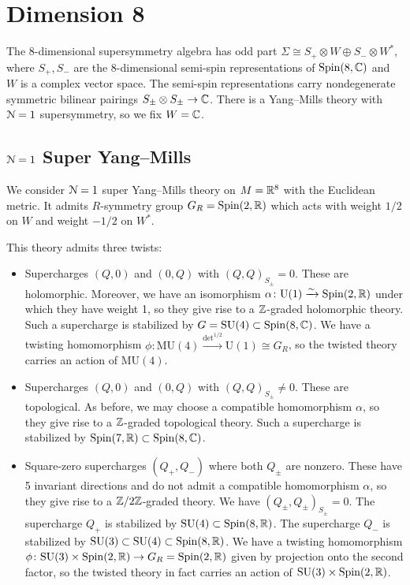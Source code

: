 \documentclass[10pt, oneside]{article}
\newcommand{\MU}{\mathrm{MU}}
\renewcommand{\U}{\mathrm{U}}
\begin{document}
\section{Dimension 8}

The 8-dimensional supersymmetry algebra has odd part $\Sigma\cong S_+\otimes W\oplus S_-\otimes W^*$, where $S_+, S_-$ are the 8-dimensional semi-spin representations of $\mathrm{Spin}(8, \mathbb C)$ and $W$ is a complex vector space. The semi-spin representations carry nondegenerate symmetric bilinear pairings $S_{\pm}\otimes S_{\pm}\rightarrow \mathbb C$. There is a Yang--Mills theory with $\mathcal{N}=1$ supersymmetry, so we fix $W = \mathbb C$.

\subsection{\texorpdfstring{$\mathcal N=1$}{N=1} Super Yang--Mills}

We consider $\mathcal N=1$ super Yang--Mills theory on $M=\mathbb R^8$ with the Euclidean metric. It admits $R$-symmetry group $G_R=\mathrm{Spin}(2, \mathbb R)$ which acts with weight $1/2$ on $W$ and weight $-1/2$ on $W^*$.

This theory admits three twists:
\begin{itemize}
\item Supercharges $(Q, 0)$ and $(0, Q)$ with $(Q, Q)_{S_\pm} = 0$. These are holomorphic. Moreover, we have an isomorphism $\alpha\colon \U(1)\xrightarrow{\sim} \Spin(2, \RR)$ under which they have weight 1, so they give rise to a $\mathbb Z$-graded holomorphic theory. Such a supercharge is stabilized by $G=\mathrm{SU}(4)\subset \mathrm{Spin}(8, \mathbb C)$. We have a twisting homomorphism $\phi\colon \MU(4)\xrightarrow{\det^{1/2}} \U(1)\cong G_R$, so the twisted theory carries an action of $\MU(4)$.

\item Supercharges $(Q, 0)$ and $(0, Q)$ with $(Q, Q)_{S_\pm}\neq 0$. These are topological. As before, we may choose a compatible homomorphism $\alpha$, so they give rise to a $\mathbb Z$-graded topological theory. Such a supercharge is stabilized by $\mathrm{Spin}(7, \mathbb R)\subset \mathrm{Spin}(8, \mathbb C)$.

\item Square-zero supercharges $(Q_+, Q_-)$ where both $Q_{\pm}$ are nonzero. These have 5 invariant directions and do not admit a compatible homomorphism $\alpha$, so they give rise to a $\mathbb Z/2\mathbb Z$-graded theory. We have $(Q_\pm, Q_\pm)_{S_\pm} = 0$. The supercharge $Q_+$ is stabilized by $\mathrm{SU}(4)\subset \mathrm{Spin}(8, \mathbb R)$. The supercharge $Q_-$ is stabilized by $\mathrm{SU}(3)\subset \mathrm{SU}(4)\subset \mathrm{Spin}(8, \mathbb R)$. We have a twisting homomorphism $\phi\colon \mathrm{SU}(3)\times \mathrm{Spin}(2, \mathbb R)\rightarrow G_R=\mathrm{Spin}(2, \mathbb R)$ given by projection onto the second factor, so the twisted theory in fact carries an action of $\mathrm{SU}(3)\times \mathrm{Spin}(2, \mathbb R)$.
\end{itemize}
\end{document}
